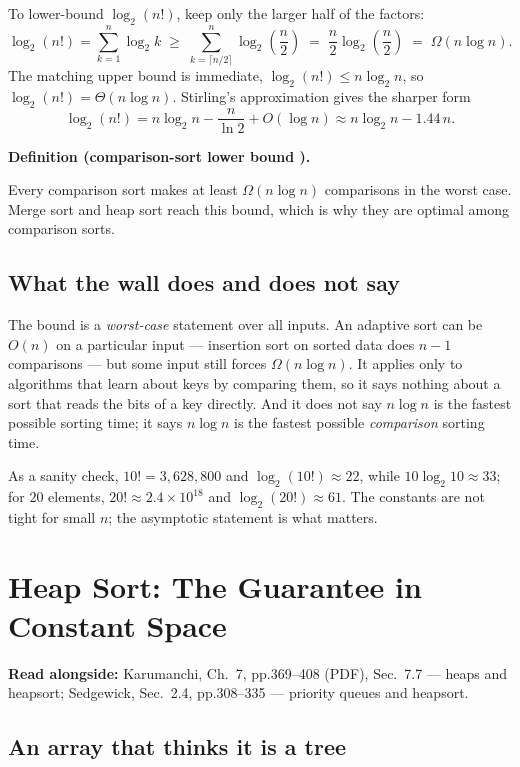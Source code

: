 \documentclass[11pt]{article}
\newenvironment{definitionbox}[1]{%
  \par\noindent\textbf{Definition (#1).}\ \itshape
}{\par\vspace{0.3em}}
\begin{document}
To lower-bound $\log_2(n!)$, keep only the larger half of the factors:
\[
  \log_2(n!) = \sum_{k=1}^{n}\log_2 k
  \;\ge\; \sum_{k=\lceil n/2\rceil}^{n}\log_2\!\left(\frac{n}{2}\right)
  \;=\; \frac{n}{2}\log_2\!\left(\frac{n}{2}\right)
  \;=\; \Omega(n\log n).
\]
The matching upper bound is immediate, $\log_2(n!) \le n\log_2 n$, so $\log_2(n!) = \Theta(n\log n)$. Stirling's approximation gives the sharper form
\[
  \log_2(n!) = n\log_2 n - \frac{n}{\ln 2} + O(\log n)
  \approx n\log_2 n - 1.44\,n.
\]

\begin{definitionbox}{comparison-sort lower bound \cite{AhoHopcroftUllman1983_data_structures_algorithms,Knuth1998_taocp_volume3}}
Every comparison sort makes at least $\Omega(n\log n)$ comparisons in the worst case. Merge sort and heap sort reach this bound, which is why they are optimal among comparison sorts.
\end{definitionbox}

\subsection{What the wall does and does not say}

The bound is a \emph{worst-case} statement over all inputs. An adaptive sort can be $O(n)$ on a particular input --- insertion sort on sorted data does $n-1$ comparisons --- but some input still forces $\Omega(n\log n)$. It applies only to algorithms that learn about keys by comparing them, so it says nothing about a sort that reads the bits of a key directly. And it does not say $n\log n$ is the fastest possible sorting time; it says $n\log n$ is the fastest possible \emph{comparison} sorting time.

As a sanity check, $10! = 3{,}628{,}800$ and $\log_2(10!) \approx 22$, while $10\log_2 10 \approx 33$; for $20$ elements, $20! \approx 2.4\times10^{18}$ and $\log_2(20!) \approx 61$. The constants are not tight for small $n$; the asymptotic statement is what matters.

\section{Heap Sort: The Guarantee in Constant Space}

\textbf{Read alongside:} Karumanchi, Ch.~7, pp.369--408 (PDF), Sec.~7.7 --- heaps and heapsort; Sedgewick, Sec.~2.4, pp.308--335 --- priority queues and heapsort.

\subsection{An array that thinks it is a tree}
\end{document}
